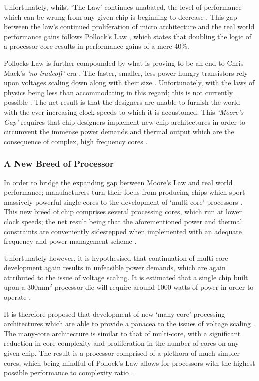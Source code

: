 \documentclass[12pt,a4paper]{article}
\begin{document}
Unfortunately, whilst `The Law' continues unabated, the level of performance which can be wrung from any given chip is beginning to decrease \cite{theKillRule}. This gap between the law's continued proliferation of micro architecture and the real world performance gains follows Pollock's Law \cite{thousandCoreChips}, which states that doubling the logic of a processor core results in performance gains of a mere 40\%.

Pollocks Law is further compounded by what is proving to be an end to Chris Mack's \textit{`no tradeoff'} era \cite{fiftyYearsOfMoores}. The faster, smaller, less power hungry transistors rely upon voltages scaling down along with their size \cite{frequencyAndVoltage}. Unfortunately, with the laws of physics being less than accommodating in this regard; this is not currently possible \cite{frequencyAndVoltage}. The net result is that the designers are unable to furnish the world with the ever increasing clock speeds to which it is accustomed. This \textit{`Moore's Gap'} \cite{theKillRule} requires that chip designers implement new chip architectures in order to circumvent the immense power demands and thermal output which are the consequence of complex, high frequency cores \cite{frequencyAndVoltage}.

\subsubsection{A New Breed of Processor}

In order to bridge the expanding gap between Moore's Law and real world performance; manufacturers turn their focus from producing chips which sport massively powerful single cores to the development of `multi-core' processors \cite{thousandCoreChips,frequencyAndVoltage}. This new breed of chip comprises several processing cores, which run at lower clock speeds; the net result being that the aforementioned power and thermal constraints are conveniently sidestepped when implemented with an adequate frequency and power management scheme \cite{frequencyAndVoltage}.

Unfortunately however, it is hypothesised \cite{thousandCoreChips} that continuation of multi-core development again results in unfeasible power demands, which are again attributed to the issue of voltage scaling. It is estimated that a single chip built upon a 300mm$^{2}$ processor die will require around 1000 watts of power in order to operate \cite{thousandCoreChips}.

It is therefore proposed that development of new `many-core' processing architectures which are able to provide a panacea to the issues of voltage scaling \cite{thousandCoreChips}. The many-core architecture is similar to that of multi-core, with a significant reduction in core complexity and proliferation in the number of cores on any given chip. The result is a processor comprised of a plethora of much simpler cores, which being mindful of Pollock's Law allows for processors with the highest possible performance to complexity ratio \cite{thousandCoreChips}.
\end{document}
